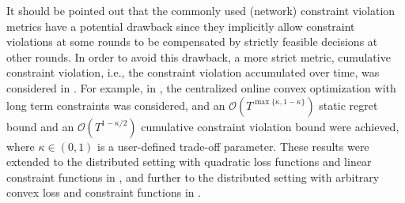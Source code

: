 \documentclass[12pt,draftcls,onecolumn]{IEEEtran}%
\begin{document}
It should be pointed out that the commonly used (network) constraint violation metrics have a potential drawback since they implicitly allow constraint violations at some rounds to be compensated by strictly feasible decisions at other rounds. In order to avoid this drawback, a more strict metric, cumulative constraint violation, i.e., the constraint violation accumulated over time, was considered in \cite{NIPS2018_7852,yi2021regret,yuan2021distributed,yuan2021distributedb}. For example, in \cite{NIPS2018_7852}, the centralized online convex optimization with long term constraints was considered, and an $\mathcal{O}(T^{\max\{\kappa,1-\kappa\}})$ static regret bound and an $\mathcal{O}(T^{1-\kappa/2})$ cumulative constraint violation bound were achieved, where $\kappa\in(0,1)$ is a user-defined trade-off parameter. These results were extended to the distributed setting with quadratic loss functions and linear constraint functions in \cite{yuan2021distributed}, and further to the distributed setting with arbitrary convex loss and constraint functions in \cite{yuan2021distributedb}.
\end{document}
